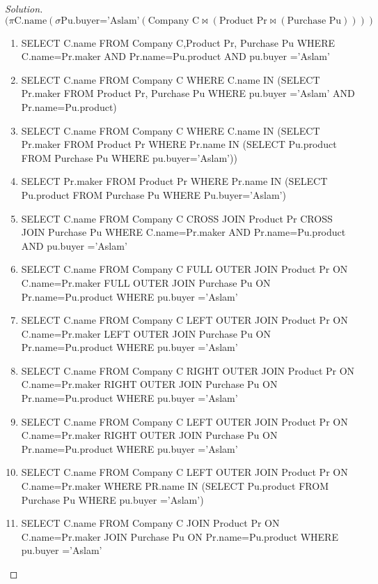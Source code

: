 \documentclass[10pt,a4paper]{article}
\begin{document}
\begin{proof}[Solution]

\begin{equation*}
(\pi \text{C.name}( \sigma \text{Pu.buyer='Aslam'} (\text{Company C} \bowtie (\text{Product Pr} \bowtie (\text{Purchase Pu}))))
\end{equation*}


\begin{enumerate}
	\item SELECT C.name FROM Company C,Product Pr, Purchase Pu WHERE  C.name=Pr.maker AND Pr.name=Pu.product AND pu.buyer ='Aslam'
	\item SELECT C.name FROM Company C WHERE C.name IN (SELECT Pr.maker FROM Product Pr, Purchase Pu WHERE pu.buyer ='Aslam' AND Pr.name=Pu.product)
	\item SELECT C.name FROM Company C WHERE C.name IN (SELECT Pr.maker
FROM Product Pr WHERE Pr.name IN (SELECT Pu.product FROM Purchase Pu WHERE pu.buyer='Aslam'))
	\item SELECT Pr.maker FROM Product Pr WHERE Pr.name IN (SELECT Pu.product FROM Purchase Pu WHERE Pu.buyer='Aslam')
	\item SELECT C.name FROM Company C CROSS JOIN Product Pr CROSS JOIN Purchase Pu WHERE C.name=Pr.maker AND Pr.name=Pu.product AND pu.buyer ='Aslam'
	\item SELECT C.name FROM Company C FULL OUTER JOIN Product Pr ON C.name=Pr.maker FULL OUTER JOIN Purchase Pu ON Pr.name=Pu.product WHERE pu.buyer ='Aslam'
	\item SELECT C.name FROM Company C LEFT OUTER JOIN Product Pr 
ON C.name=Pr.maker LEFT OUTER JOIN Purchase Pu ON Pr.name=Pu.product WHERE pu.buyer ='Aslam'
	\item SELECT C.name FROM Company C RIGHT OUTER JOIN Product Pr ON C.name=Pr.maker RIGHT OUTER JOIN Purchase Pu ON Pr.name=Pu.product WHERE pu.buyer ='Aslam' 
	\item SELECT C.name FROM Company C LEFT OUTER JOIN Product Pr ON C.name=Pr.maker RIGHT OUTER JOIN Purchase Pu ON Pr.name=Pu.product WHERE pu.buyer ='Aslam'
	\item SELECT C.name FROM Company C LEFT OUTER JOIN Product Pr ON C.name=Pr.maker WHERE PR.name IN (SELECT Pu.product FROM Purchase Pu WHERE pu.buyer ='Aslam')
	\item SELECT C.name FROM Company C JOIN Product Pr ON C.name=Pr.maker JOIN Purchase Pu ON Pr.name=Pu.product WHERE pu.buyer ='Aslam' 
\end{enumerate}
\end{proof}
\end{document}
